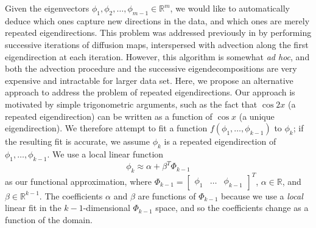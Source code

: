 Given the eigenvectors $\phi_1, \phi_2, \dots, \phi_{m-1} \in \mathbb{R}^m$, we would like to automatically deduce which ones capture new directions in the data, and which ones are merely repeated eigendirections.
%
This problem was addressed previously in \cite{gerber2007robust} by performing successive iterations of diffusion maps, interspersed with advection along the first eigendirection at each iteration.
%
However, this algorithm is somewhat {\em ad hoc}, and both the advection procedure and the successive eigendecompositions are very expensive and intractable for larger data set.
%
Here, we propose an alternative approach to address the problem of repeated eigendirections.
%
Our approach is motivated by simple trigonometric arguments, such as the fact that $\cos2x$ (a repeated eigendirection) can be written as a function of $\cos x$ (a unique eigendirection).
%
We therefore attempt to fit a function $f(\phi_1, \dots, \phi_{k-1})$ to $\phi_{k}$; if the resulting fit is accurate, we assume $\phi_{k}$ is a repeated eigendirection of $\phi_1, \dots, \phi_{k-1}$.
%
We use a local linear function
\begin{equation}
\phi_k \approx \alpha + \beta^T \Phi_{k-1}
\end{equation}
%
as our functional approximation, where
%
$\Phi_{k-1} = \begin{bmatrix} \phi_1 & \dots & \phi_{k-1} \end{bmatrix}^T$,
$\alpha \in \mathbb{R}$, and $\beta \in \mathbb{R}^{k-1}$.
%
The coefficients $\alpha$ and $\beta$ are functions of $\Phi_{k-1}$ because we use a {\em local} linear fit in the $k-1$-dimensional $\Phi_{k-1}$ space, and so the coefficients change as a function of the domain.

